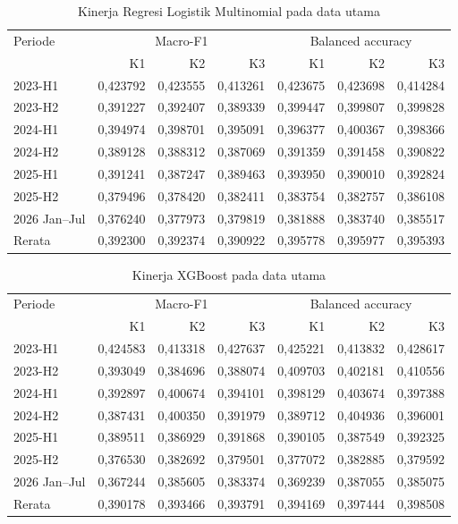 \begin{table}[htbp]
\centering
\small
\setlength{\tabcolsep}{4pt}
\caption{Kinerja Regresi Logistik Multinomial pada data utama}
\label{tab:hasil-logistik}
\begin{tabular}{lrrrrrr}
\toprule
Periode & \multicolumn{3}{c}{Macro-F1} & \multicolumn{3}{c}{Balanced accuracy} \\
 & K1 & K2 & K3 & K1 & K2 & K3 \\
\midrule
2023-H1 & 0,423792 & 0,423555 & 0,413261 & 0,423675 & 0,423698 & 0,414284 \\
2023-H2 & 0,391227 & 0,392407 & 0,389339 & 0,399447 & 0,399807 & 0,399828 \\
2024-H1 & 0,394974 & 0,398701 & 0,395091 & 0,396377 & 0,400367 & 0,398366 \\
2024-H2 & 0,389128 & 0,388312 & 0,387069 & 0,391359 & 0,391458 & 0,390822 \\
2025-H1 & 0,391241 & 0,387247 & 0,389463 & 0,393950 & 0,390010 & 0,392824 \\
2025-H2 & 0,379496 & 0,378420 & 0,382411 & 0,383754 & 0,382757 & 0,386108 \\
2026 Jan--Jul & 0,376240 & 0,377973 & 0,379819 & 0,381888 & 0,383740 & 0,385517 \\
\midrule
Rerata & 0,392300 & 0,392374 & 0,390922 & 0,395778 & 0,395977 & 0,395393 \\
\bottomrule
\end{tabular}
\end{table}


\begin{table}[htbp]
\centering
\small
\setlength{\tabcolsep}{4pt}
\caption{Kinerja XGBoost pada data utama}
\label{tab:hasil-xgboost}
\begin{tabular}{lrrrrrr}
\toprule
Periode & \multicolumn{3}{c}{Macro-F1} & \multicolumn{3}{c}{Balanced accuracy} \\
 & K1 & K2 & K3 & K1 & K2 & K3 \\
\midrule
2023-H1 & 0,424583 & 0,413318 & 0,427637 & 0,425221 & 0,413832 & 0,428617 \\
2023-H2 & 0,393049 & 0,384696 & 0,388074 & 0,409703 & 0,402181 & 0,410556 \\
2024-H1 & 0,392897 & 0,400674 & 0,394101 & 0,398129 & 0,403674 & 0,397388 \\
2024-H2 & 0,387431 & 0,400350 & 0,391979 & 0,389712 & 0,404936 & 0,396001 \\
2025-H1 & 0,389511 & 0,386929 & 0,391868 & 0,390105 & 0,387549 & 0,392325 \\
2025-H2 & 0,376530 & 0,382692 & 0,379501 & 0,377072 & 0,382885 & 0,379592 \\
2026 Jan--Jul & 0,367244 & 0,385605 & 0,383374 & 0,369239 & 0,387055 & 0,385075 \\
\midrule
Rerata & 0,390178 & 0,393466 & 0,393791 & 0,394169 & 0,397444 & 0,398508 \\
\bottomrule
\end{tabular}
\end{table}


